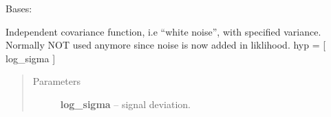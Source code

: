 \documentclass[letterpaper,10pt,english]{sphinxmanual}
\begin{document}
\begin{fulllineitems}
\begin{fulllineitems}
\label{pyGPs.Core:pyGPs.Core.cov.Matern.getCovMatrix}
\end{fulllineitems}


\begin{fulllineitems}
\label{pyGPs.Core:pyGPs.Core.cov.Matern.getDerMatrix}
\end{fulllineitems}


\begin{fulllineitems}
\label{pyGPs.Core:pyGPs.Core.cov.Matern.mfunc}
\end{fulllineitems}


\end{fulllineitems}


\begin{fulllineitems}
\label{pyGPs.Core:pyGPs.Core.cov.Noise}
Bases: 

Independent covariance function, i.e ``white noise'', with specified variance.
Normally NOT used anymore since noise is now added in liklihood.
hyp = {[} log\_sigma {]}
\begin{quote}\begin{description}
\item[{Parameters}] \leavevmode
\textbf{log\_sigma} -- signal deviation.

\end{description}\end{quote}

\begin{fulllineitems}
\label{pyGPs.Core:pyGPs.Core.cov.Noise.getCovMatrix}
\end{fulllineitems}


\begin{fulllineitems}
\label{pyGPs.Core:pyGPs.Core.cov.Noise.getDerMatrix}
\end{fulllineitems}


\end{fulllineitems}
\end{document}
